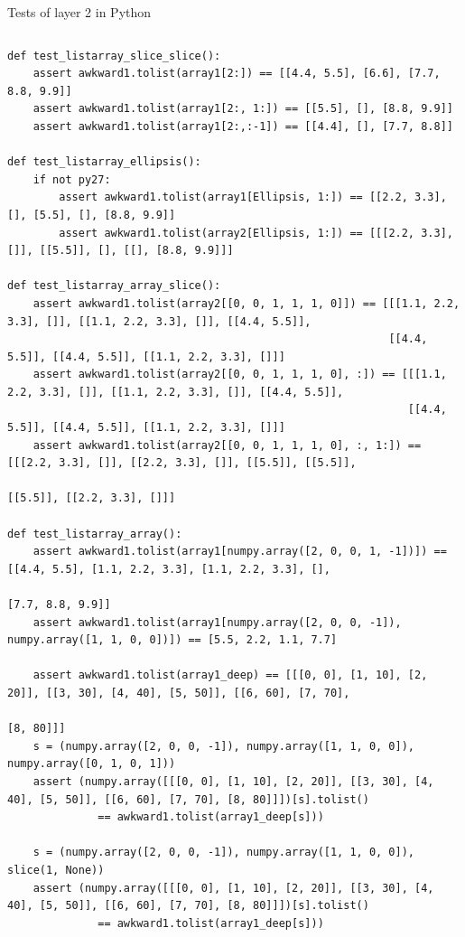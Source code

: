 \documentclass[aspectratio=169]{beamer}
\begin{document}
\begin{frame}[fragile]{Tests of layer 2 in Python}
\tiny
\vspace{0.05 cm}
\begin{columns}
\begin{verbatim}
def test_listarray_slice_slice():
    assert awkward1.tolist(array1[2:]) == [[4.4, 5.5], [6.6], [7.7, 8.8, 9.9]]
    assert awkward1.tolist(array1[2:, 1:]) == [[5.5], [], [8.8, 9.9]]
    assert awkward1.tolist(array1[2:,:-1]) == [[4.4], [], [7.7, 8.8]]

def test_listarray_ellipsis():
    if not py27:
        assert awkward1.tolist(array1[Ellipsis, 1:]) == [[2.2, 3.3], [], [5.5], [], [8.8, 9.9]]
        assert awkward1.tolist(array2[Ellipsis, 1:]) == [[[2.2, 3.3], []], [[5.5]], [], [[], [8.8, 9.9]]]

def test_listarray_array_slice():
    assert awkward1.tolist(array2[[0, 0, 1, 1, 1, 0]]) == [[[1.1, 2.2, 3.3], []], [[1.1, 2.2, 3.3], []], [[4.4, 5.5]],
                                                           [[4.4, 5.5]], [[4.4, 5.5]], [[1.1, 2.2, 3.3], []]]
    assert awkward1.tolist(array2[[0, 0, 1, 1, 1, 0], :]) == [[[1.1, 2.2, 3.3], []], [[1.1, 2.2, 3.3], []], [[4.4, 5.5]],
                                                              [[4.4, 5.5]], [[4.4, 5.5]], [[1.1, 2.2, 3.3], []]]
    assert awkward1.tolist(array2[[0, 0, 1, 1, 1, 0], :, 1:]) == [[[2.2, 3.3], []], [[2.2, 3.3], []], [[5.5]], [[5.5]],
                                                                  [[5.5]], [[2.2, 3.3], []]]

def test_listarray_array():
    assert awkward1.tolist(array1[numpy.array([2, 0, 0, 1, -1])]) == [[4.4, 5.5], [1.1, 2.2, 3.3], [1.1, 2.2, 3.3], [],
                                                                      [7.7, 8.8, 9.9]]
    assert awkward1.tolist(array1[numpy.array([2, 0, 0, -1]), numpy.array([1, 1, 0, 0])]) == [5.5, 2.2, 1.1, 7.7]

    assert awkward1.tolist(array1_deep) == [[[0, 0], [1, 10], [2, 20]], [[3, 30], [4, 40], [5, 50]], [[6, 60], [7, 70],
                                                                                                      [8, 80]]]
    s = (numpy.array([2, 0, 0, -1]), numpy.array([1, 1, 0, 0]), numpy.array([0, 1, 0, 1]))
    assert (numpy.array([[[0, 0], [1, 10], [2, 20]], [[3, 30], [4, 40], [5, 50]], [[6, 60], [7, 70], [8, 80]]])[s].tolist()
              == awkward1.tolist(array1_deep[s]))

    s = (numpy.array([2, 0, 0, -1]), numpy.array([1, 1, 0, 0]), slice(1, None))
    assert (numpy.array([[[0, 0], [1, 10], [2, 20]], [[3, 30], [4, 40], [5, 50]], [[6, 60], [7, 70], [8, 80]]])[s].tolist()
              == awkward1.tolist(array1_deep[s]))
\end{verbatim}
\end{columns}
\end{frame}
\end{document}
